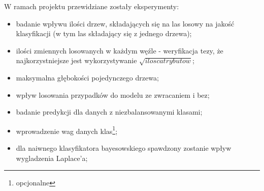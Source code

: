 W ramach projektu przewidziane zostały eksperymenty:
\begin{itemize}
    \item badanie wpływu ilości drzew, składających się na las losowy na jakość klasyfikacji (w tym las składający się z jednego drzewa);
    \item ilości zmiennych losowanych w każdym węźle - weryfikacja tezy, że najkorzystniejsze jest wykorzystywanie $\sqrt {ilosc atrybutow}$;
    \item maksymalna głębokości pojedynczego drzewa;
    \item wpływ losowania przypadków do modelu ze zwracaniem i bez;
    \item badanie predykcji dla danych z niezbalansowanymi klasami;
        \item wprowadzenie wag danych klas\footnote[*]{opcjonalne};
        \item dla naiwnego klasyfikatora bayesowskiego spawdzony zostanie wpływ wygladzenia Laplace'a;
        
\end{itemize}
